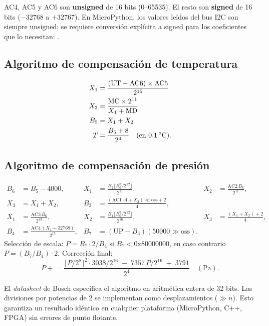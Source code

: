 \documentclass[11pt]{article}
\begin{document}
\begin{nota}
AC4, AC5 y AC6 son \textbf{unsigned} de 16 bits (0--65535). El resto son \textbf{signed}
de 16 bits ($-32768$ a $+32767$). En MicroPython, los valores leídos del bus I2C son
siempre unsigned; se requiere conversión explícita a signed para los coeficientes que lo
necesitan: .
\end{nota}

\subsection{Algoritmo de compensación de temperatura}
\begin{align}
  X_1 &= \frac{(\text{UT} - \text{AC6})\times\text{AC5}}{2^{15}} \\
  X_2 &= \frac{\text{MC}\times 2^{11}}{X_1 + \text{MD}} \\
  B_5 &= X_1 + X_2 \\
  T   &= \frac{B_5 + 8}{2^4} \quad (\text{en \SI{0.1}{\celsius}}).
\end{align}

\subsection{Algoritmo de compensación de presión}
\begin{align}
  B_6 &= B_5 - 4000, &
  X_1 &= \frac{B_2\lfloor B_6^2/2^{12}\rfloor}{2^{11}}, &
  X_2 &= \frac{\text{AC2}\,B_6}{2^{11}}, \\
  X_3 &= X_1 + X_2, &
  B_3 &= \frac{(\text{AC1}\cdot 4 + X_3)\ll\text{oss} + 2}{4}, & & \\
  X_1 &= \frac{\text{AC3}\,B_6}{2^{13}}, &
  X_2 &= \frac{B_1\lfloor B_6^2/2^{12}\rfloor}{2^{16}}, &
  X_3 &= \frac{(X_1+X_2)+2}{4}, \\
  B_4 &= \frac{\text{AC4}\,(X_3+32768)}{2^{15}}, &
  B_7 &= (\text{UP}-B_3)(50000\gg\text{oss}). & &
\end{align}
Selección de escala: $P = B_7\cdot 2 / B_4$ si $B_7 < \mathrm{0x80000000}$, en caso
contrario $P = (B_7/B_4)\cdot 2$. Corrección final:
\begin{equation}
  P \mathrel{+}= \frac{\lfloor P/2^8\rfloor^2\cdot 3038/2^{16} \;-\; 7357\,P/2^{16} \;+\; 3791}{2^4}
  \quad(\si{\pascal}).
\end{equation}

\begin{nota}
El \emph{datasheet} de Bosch especifica el algoritmo en aritmética entera de 32 bits. Las
divisiones por potencias de 2 se implementan como desplazamientos ($\gg n$). Esto
garantiza un resultado idéntico en cualquier plataforma (MicroPython, C++, FPGA) sin
errores de punto flotante.
\end{nota}
\end{document}
